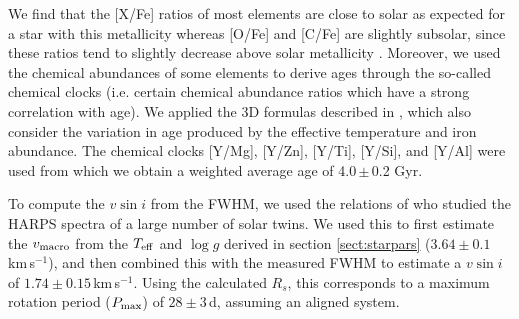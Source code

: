 \documentclass[fleqn,usenatbib]{mnras}
\newcommand{\harps}{{HARPS}}
\newcommand{\kms}{km\,s$^{-1}$}
\newcommand{\vsini}{$v\sin{i}$}
\newcommand{\teff}{$T_{\rm eff}$}
\newcommand{\logg}{$\log g$}
\newcommand{\Tstarage}{4.0\,$\pm$\,0.2 Gyr}
\begin{document}
We find that the [X/Fe] ratios of most elements are close to solar as expected for a star with this metallicity whereas [O/Fe] and [C/Fe] are slightly subsolar, since these ratios tend to slightly decrease above solar metallicity \cite[e.g.][]{Bertrandelis-15,Franchini2020}. Moreover, we used the chemical abundances of some elements to derive ages through the so-called chemical clocks (i.e. certain chemical abundance ratios which have a strong correlation with age). We applied the 3D formulas described in \citet{Delgado-19}, which also consider the variation in age produced by the effective temperature and iron abundance. The chemical clocks [Y/Mg], [Y/Zn], [Y/Ti], [Y/Si], and [Y/Al] were used from which we obtain a weighted average age of \Tstarage{}.

To compute the \vsini{} from the FWHM, we used the relations of \citet{dos2016solar} who studied the \harps{} spectra of a large number of solar twins.
We used this to first estimate the $v_{\rm macro}$ from the \teff{} and \logg{} derived in section \ref{sect:starpars} ($3.64\pm0.1$\,\kms{}), and then combined this with the measured FWHM to estimate a \vsini{} of $1.74\pm0.15$\,\kms{}.
Using the calculated $R_s$, this corresponds to a maximum rotation period ($P_{\rm max}$) of $28\pm3$\,d, assuming an aligned system.
\end{document}
